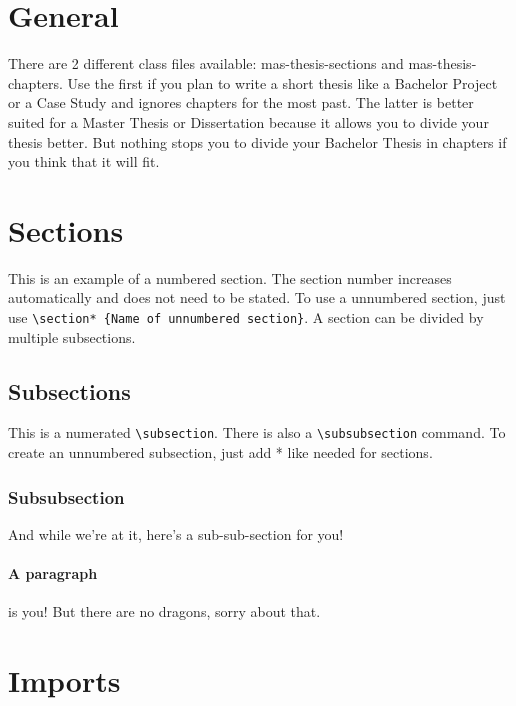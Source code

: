 \documentclass[masterarbeit, grey, english]{mas-thesis-sections}	%
\begin{document}
\section{General}

There are 2 different class files available: mas-thesis-sections and mas-thesis-chapters. Use the first if you plan to write a short thesis like a Bachelor Project or a Case Study and ignores chapters for the most past. The latter is better suited for a Master Thesis or Dissertation because it allows you to divide your thesis better. But nothing stops you to divide your Bachelor Thesis in chapters if you think that it will fit.



\section{Sections}

This is an example of a numbered section. The section number increases automatically and does not need to be stated. To use a unnumbered section, just use \texttt{\textbackslash section* \{Name of unnumbered section\}}. A section can be divided by multiple subsections.

\subsection{Subsections}

This is a numerated \texttt{\textbackslash subsection}. There is also a \texttt{\textbackslash subsubsection} command. To create an unnumbered subsection, just add * like needed for sections.

\subsubsection{Subsubsection}

And while we're at it, here's a sub-sub-section for you!

\paragraph{A paragraph} is you! But there are no dragons, sorry about that.



\section{Imports}
\end{document}
